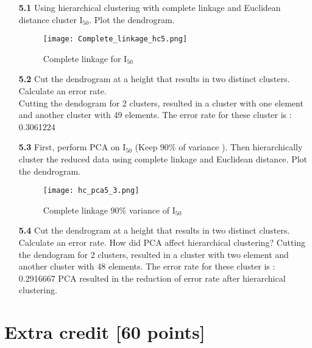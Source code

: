 \documentclass{article}
\begin{document}
 \begin{enumerate}
  \item[\textbf{5.1}]  Using hierarchical clustering with complete linkage and Euclidean distance cluster $\text{I}_{50}$. Plot the dendrogram.
\\ 

\begin{figure}[H]
      \texttt{[image: Complete\_linkage\_hc5.png]}
      \caption{Complete linkage for $\text{I}_{50}$}
  	\end{figure}
    
     
\item[\textbf{5.2}] Cut the dendrogram at a height that results in two distinct  clusters. Calculate an error rate.
\\  Cutting the dendogram for 2 clusters, resulted in a cluster with one element and another cluster with 49 elements.
The error rate for these cluster is : 0.3061224


  \item[\textbf{5.3}] First, perform PCA on $\text{I}_{50}$ (Keep $90\%$ of variance ). Then hierarchically cluster the reduced data using complete linkage and Euclidean distance. Plot the dendrogram.
\\  
  \begin{figure}[H]
      \texttt{[image: hc\_pca5\_3.png]}
      \caption{Complete linkage 90\% variance of $\text{I}_{50}$}
  	\end{figure}
  
    \item[\textbf{5.4}]  Cut the dendrogram at a height that results in two distinct  clusters. Calculate an error rate. How  did PCA affect hierarchical clustering?
    Cutting the dendogram for 2 clusters, resulted in a cluster with two element and another cluster with 48 elements.
The error rate for these cluster is : 0.2916667
PCA resulted in the reduction of error rate after hierarchical clustering.
    
    
    
\end{enumerate}
 






\section*{Extra credit [60 points]}
\end{document}
